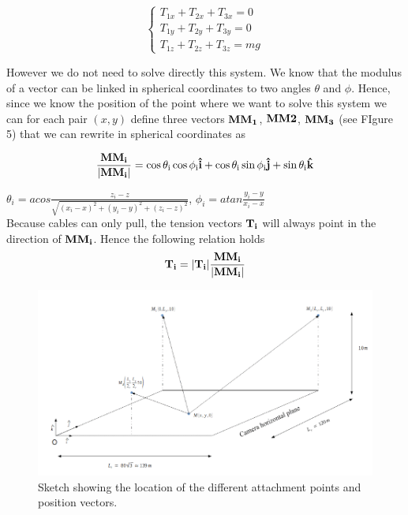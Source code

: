 \documentclass[10 pt]{article}
\begin{document}
\begin{multicols}{2}
\begin{equation}
\begin{cases}
T_{1x} + T_{2x} + T_{3x} = 0\\
T_{1y} + T_{2y} + T_{3y} = 0\\
T_{1z} + T_{2z} + T_{3z} = mg
\end{cases}
\end{equation}

However we do not need to solve directly this system. We know that the modulus of a vector can be linked in spherical coordinates to two angles $\theta$ and $\phi$. Hence, since we know the position of the point where we want to solve this system we can for each pair $(x,y)$ define three vectors $\bf MM_1$, $\bf MM2$, $\bf MM_3$ (see FIgure 5) that we can rewrite in spherical coordinates as

\begin{equation}
\frac{\bf MM_i}{|\bf MM_i \rm |} \rm = \cos \theta_i \cos\phi_i \bf \hat i \rm + \cos \theta_i \sin\phi_i \bf \hat j \rm +  \sin \theta_i \bf \hat k
\end{equation}

$\theta_i = acos \frac{z_i - z}{\sqrt{(x_i - x)^2 + (y_i - y)^2 + (z_i - z)^2}}$, $\phi_i = atan \frac{y_i - y}{x_i - x}$\\

Because cables can only pull, the tension vectors $\bf T_i$ will always point in the direction of $\bf MM_i$. Hence the following relation holds
\begin{equation}
\bf T_i \rm = |\bf T_i \rm | \frac{\bf MM_i}{|\bf MM_i\rm |}
\end{equation}

\end{multicols}

\begin{figure}[H]
\centering
\includegraphics[width = 0.7\linewidth]{sketch}
\caption{Sketch showing the location of the different attachment points and position vectors.}
\end{figure}
\end{document}
